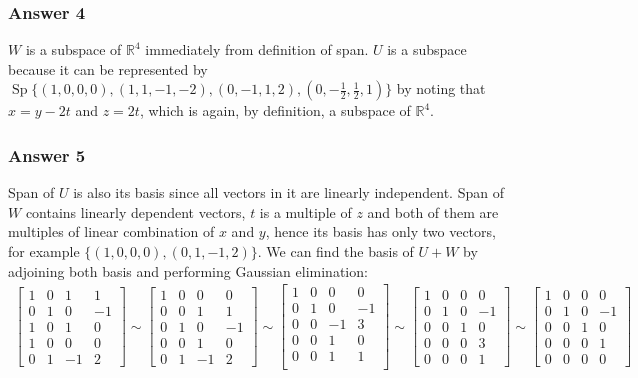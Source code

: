 \documentclass[11pt]{article}
\DeclareMathOperator{\Sp}{Sp}
\begin{document}
\subsubsection{Answer 4}
\label{sec-1-2-1}
$W$ is a subspace of $\mathbb{R}^4$ immediately from definition of span.
$U$ is a subspace because it can be represented by $\Sp\{(1,0,0,0),
    (1,1,-1,-2), (0,-1,1,2), (0,-\frac{1}{2},\frac{1}{2},1)\}$ by noting that $x
    = y - 2t$ and $z = 2t$, which is again, by definition, a subspace of
$\mathbb{R}^4$.

\subsubsection{Answer 5}
\label{sec-1-2-2}
Span of $U$ is also its basis since all vectors in it are linearly
independent.  Span of $W$ contains linearly dependent vectors, $t$ is a
multiple of $z$ and both of them are multiples of linear combination of $x$
and $y$, hence its basis has only two vectors, for example $\{(1,0,0,0),
    (0,1,-1,2)\}$.  We can find the basis of $U + W$ by adjoining both basis
and performing Gaussian elimination:
\begin{align*}
  \begin{bmatrix}
    1 & 0 & 1 & 1 \\
    0 & 1 & 0 & -1 \\ 
    1 & 0 & 1 & 0 \\
    1 & 0 & 0 & 0 \\
    0 & 1 & -1 & 2
  \end{bmatrix} \sim
  \begin{bmatrix}
    1 & 0 & 0 & 0 \\
    0 & 0 & 1 & 1 \\
    0 & 1 & 0 & -1 \\ 
    0 & 0 & 1 & 0 \\
    0 & 1 & -1 & 2
  \end{bmatrix} \sim
  \begin{bmatrix}
    1 & 0 & 0 & 0 \\
    0 & 1 & 0 & -1 \\ 
    0 & 0 & -1 & 3 \\
    0 & 0 & 1 & 0 \\
    0 & 0 & 1 & 1 \\
  \end{bmatrix} \sim
  \begin{bmatrix}
    1 & 0 & 0 & 0 \\
    0 & 1 & 0 & -1 \\ 
    0 & 0 & 1 & 0 \\
    0 & 0 & 0 & 3 \\
    0 & 0 & 0 & 1
  \end{bmatrix} \sim
  \begin{bmatrix}
    1 & 0 & 0 & 0 \\
    0 & 1 & 0 & -1 \\ 
    0 & 0 & 1 & 0 \\
    0 & 0 & 0 & 1 \\
    0 & 0 & 0 & 0
  \end{bmatrix}
\end{align*}
\end{document}
